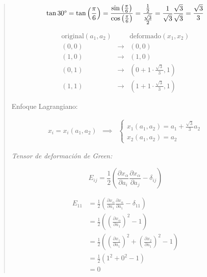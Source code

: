 \documentclass[a4paper,10pt,twoside,final,spanish]{article}
\begin{document}
\begin{quote}

\[
\tan 30\degree=\tan\left(\frac{\pi}{6}\right)
=\frac{\sin\left(\frac{\pi}{6}\right)}{\cos\left(\frac{\pi}{6}\right)}
=\frac{\frac{1}{2}}{\frac{\sqrt{3}}{2}}=\frac{1}{\sqrt{3}}\frac{\sqrt{3}}{\sqrt{3}}
=\frac{\sqrt{3}}{3}
\]

\[
\begin{array}{rcl}
\mbox{original}(a_{1},a_{2}) &     & \mbox{deformado}(x_{1},x_{2})  \\
(0,0)                        & \to & (0,0)                          \\
(1,0)                        & \to & (1,0)                          \\
(0,1)                        & \to & (0+1\cdot\frac{\sqrt{3}}{3},1) \\
(1,1)                        & \to & (1+1\cdot\frac{\sqrt{3}}{3},1)
\end{array}
\]

Enfoque Lagrangiano:

\[
\begin{array}{ccc}
x_{i}=x_{i}(a_{1},a_{2}) & \implies & \left\{\begin{array}{l}
 								   x_{1}(a_{1},a_{2})=a_{1}+\frac{\sqrt{3}}{3}a_{2} \\
   								   x_{2}(a_{1},a_{2})=a_{2}
   								   \end{array}\right.
\end{array}
\]

\textit{Tensor de deformación de Green:}

\[
E_{ij}=
\frac{1}{2}\left(
\frac{\partial x_{\alpha}}{\partial a_{i}}
\frac{\partial x_{\alpha}}{\partial a_{j}}-\delta_{ij}
\right)
\]

\begin{minipage}{0.5\linewidth}

\begin{align*}
E_{11} &=
\frac{1}{2}\left(
\frac{\partial x_{\alpha}}{\partial a_{1}}
\frac{\partial x_{\alpha}}{\partial a_{1}}-\delta_{11}
\right) \\
&=
\frac{1}{2}\left(
\left(\frac{\partial x_{\alpha}}{\partial a_{1}}\right)^{2}-1
\right) \\
&=
\frac{1}{2}\left(
\left(\frac{\partial x_{1}}{\partial a_{1}}\right)^{2}
+\left(\frac{\partial x_{2}}{\partial a_{1}}\right)^{2}-1
\right) \\
&=
\frac{1}{2}(1^{2}+0^{2}-1) \\
&= 0
\end{align*}


\end{minipage}
\end{quote}
\end{document}
